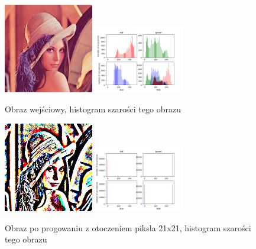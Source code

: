 \documentclass[final,a4paper,openany,12pt]{mwbk}
\begin{document}
\begin{figure}[H]
	\begin{center}
		\includegraphics[width=0.35\textwidth]{lena_color}
		\includegraphics[width=0.35\textwidth]{lena_color_histogram}
	\end{center}
	\caption{Obraz wejściowy, histogram szarości tego obrazu}
\end{figure}

\begin{figure}[H]
	\begin{center}
		\includegraphics[width=0.35\textwidth]{lena_color_localSingleThreshold_result}
		\includegraphics[width=0.35\textwidth]{lena_color_localSingleThreshold_histogram}
	\end{center}
	\caption{Obraz po progowaniu z otoczeniem piksla 21x21, histogram szarości tego obrazu}
\end{figure}
\end{document}
